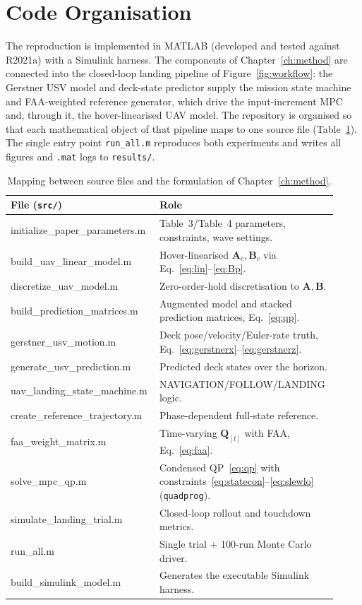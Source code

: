 \documentclass[12pt,a4paper]{report}
\begin{document}
\section{Code Organisation}
The reproduction is implemented in MATLAB (developed and tested against R2021a) with a Simulink harness. The components of Chapter~\ref{ch:method} are connected into the closed-loop landing pipeline of Figure~\ref{fig:workflow}: the Gerstner USV model and deck-state predictor supply the mission state machine and FAA-weighted reference generator, which drive the input-increment MPC and, through it, the hover-linearised UAV model. The repository is organised so that each mathematical object of that pipeline maps to one source file (Table~\ref{tab:files}). The single entry point \texttt{run\_all.m} reproduces both experiments and writes all figures and \texttt{.mat} logs to \texttt{results/}.

\begin{table}[H]
\centering
\caption{Mapping between source files and the formulation of Chapter~\ref{ch:method}.}
\label{tab:files}
\small
\renewcommand{\arraystretch}{1.3}
\begin{tabular}{>{\ttfamily\raggedright\arraybackslash}p{0.42\linewidth}
                >{\raggedright\arraybackslash}p{0.50\linewidth}}
\toprule
\normalfont File (\texttt{src/}) & \normalfont Role \\
\midrule
initialize\_paper\_parameters.m & Table~3/Table~4 parameters, constraints, wave settings. \\
build\_uav\_linear\_model.m      & Hover-linearised $\bm{A}_c,\bm{B}_c$ via Eq.~\eqref{eq:lin}--\eqref{eq:Bp}. \\
discretize\_uav\_model.m         & Zero-order-hold discretisation to $\bm{A},\bm{B}$. \\
build\_prediction\_matrices.m   & Augmented model and stacked prediction matrices, Eq.~\eqref{eq:qp}. \\
gerstner\_usv\_motion.m         & Deck pose/velocity/Euler-rate truth, Eq.~\eqref{eq:gerstnerx}--\eqref{eq:gerstnerz}. \\
generate\_usv\_prediction.m     & Predicted deck states over the horizon. \\
uav\_landing\_state\_machine.m   & NAVIGATION/FOLLOW/LANDING logic. \\
create\_reference\_trajectory.m & Phase-dependent full-state reference. \\
faa\_weight\_matrix.m           & Time-varying $\bm{Q}_{[t]}$ with FAA, Eq.~\eqref{eq:faa}. \\
solve\_mpc\_qp.m                & Condensed QP~\eqref{eq:qp} with constraints~\eqref{eq:statecon}--\eqref{eq:slewlo} (\texttt{quadprog}). \\
simulate\_landing\_trial.m      & Closed-loop rollout and touchdown metrics. \\
run\_all.m                      & Single trial + 100-run Monte Carlo driver. \\
build\_simulink\_model.m        & Generates the executable Simulink harness. \\
\bottomrule
\end{tabular}
\end{table}
\end{document}
